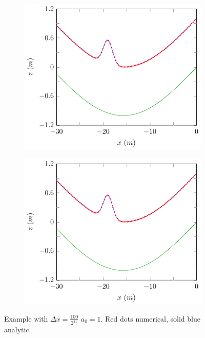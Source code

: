 \begin{figure}
	\centering
	\begin{subfigure}{0.5\textwidth}
		\includegraphics[width=\textwidth]{./chp5/figures/Forced/Wet/exFDVM2.pdf}
	\end{subfigure}%
	\begin{subfigure}{0.5\textwidth}
		\includegraphics[width=\textwidth]{./chp5/figures/Forced/Wet/exFEVM2.pdf}
	\end{subfigure}
	\caption{Example with $\Delta x = \frac{100}{2^{11}}$ $a_0 = 1$. Red dots numerical, solid blue analytic..}
	\label{fig:TravGaussWetexAll}
\end{figure}

